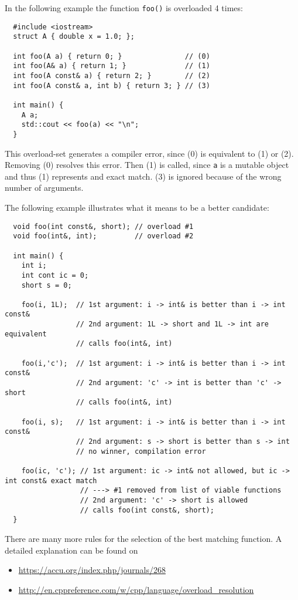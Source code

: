 \begin{example}
  In the following example the function \texttt{foo()} is overloaded 4 times:
  \begin{verbatim}
  #include <iostream>
  struct A { double x = 1.0; };

  int foo(A a) { return 0; }               // (0)
  int foo(A& a) { return 1; }              // (1)
  int foo(A const& a) { return 2; }        // (2)
  int foo(A const& a, int b) { return 3; } // (3)

  int main() {
    A a;
    std::cout << foo(a) << "\n";
  }
  \end{verbatim}
  This overload-set generates a compiler error, since (0) is equivalent to (1) or (2). Removing (0) resolves this error. Then (1) is called, since
  \texttt{a} is a mutable object and thus (1) represents and exact match. (3) is ignored because of the wrong number of arguments.
\end{example}

\begin{example}
  The following example illustrates what it means to be a better candidate:
  \begin{verbatim}
  void foo(int const&, short); // overload #1
  void foo(int&, int);         // overload #2

  int main() {
    int i;
    int cont ic = 0;
    short s = 0;

    foo(i, 1L);  // 1st argument: i -> int& is better than i -> int const&
                 // 2nd argument: 1L -> short and 1L -> int are equivalent
                 // calls foo(int&, int)

    foo(i,'c');  // 1st argument: i -> int& is better than i -> int const&
                 // 2nd argument: 'c' -> int is better than 'c' -> short
                 // calls foo(int&, int)

    foo(i, s);   // 1st argument: i -> int& is better than i -> int const&
                 // 2nd argument: s -> short is better than s -> int
                 // no winner, compilation error

    foo(ic, 'c'); // 1st argument: ic -> int& not allowed, but ic -> int const& exact match
                  // ---> #1 removed from list of viable functions
                  // 2nd argument: 'c' -> short is allowed
                  // calls foo(int const&, short);
  }
  \end{verbatim}
\end{example}

\begin{rem}
  There are many more rules for the selection of the best matching function. A detailed explanation can be found on
  \begin{itemize}
	  \item \url{https://accu.org/index.php/journals/268}
	  \item \url{http://en.cppreference.com/w/cpp/language/overload_resolution}
  \end{itemize}
\end{rem}


